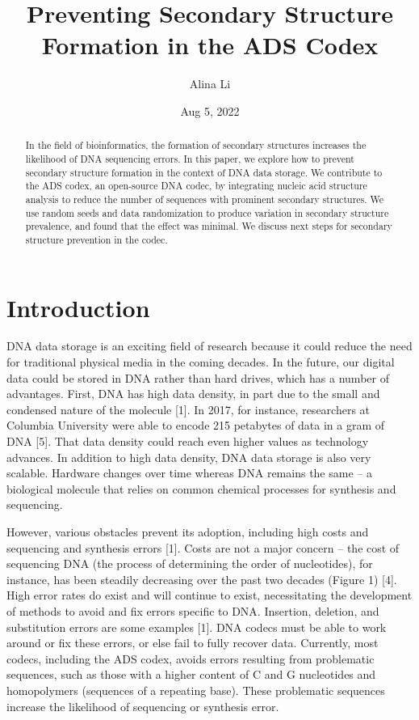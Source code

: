 \documentclass{article}
\title{Preventing Secondary Structure Formation in the ADS Codex}
\author{Alina Li}
\date{Aug 5, 2022}
\begin{document}
 
\maketitle

\begin{abstract}
In the field of bioinformatics, the formation of secondary structures increases the likelihood of DNA sequencing errors. In this paper, we explore how to prevent secondary structure formation in the context of DNA data storage. We contribute to the ADS codex, an open-source DNA codec, by integrating nucleic acid structure analysis to reduce the number of sequences with prominent secondary structures. We use random seeds and data randomization to produce variation in secondary structure prevalence, and found that the effect was minimal. We discuss next steps for secondary structure prevention in the codec.
\end{abstract}

\section{Introduction}
DNA data storage is an exciting field of research because it could reduce the need for traditional physical media in the coming decades. In the future, our digital data could be stored in DNA rather than hard drives, which has a number of advantages. First, DNA has high data density, in part due to the small and condensed nature of the molecule [1]. In 2017, for instance, researchers at Columbia University were able to encode 215 petabytes of data in a gram of DNA [5]. That data density could reach even higher values as technology advances. In addition to high data density, DNA data storage is also very scalable. Hardware changes over time whereas DNA remains the same -- a biological molecule that relies on common chemical processes for synthesis and sequencing.  

However, various obstacles prevent its adoption, including high costs and sequencing and synthesis errors [1]. Costs are not a major concern -- the cost of sequencing DNA (the process of determining the order of nucleotides), for instance, has been steadily decreasing over the past two decades (Figure 1) [4]. High error rates do exist and will continue to exist, necessitating the development of methods to avoid and fix errors specific to DNA. Insertion, deletion, and substitution errors are some examples [1]. DNA codecs must be able to work around or fix these errors, or else fail to fully recover data. Currently, most codecs, including the ADS codex, avoids errors resulting from problematic sequences, such as those with a higher content of C and G nucleotides and homopolymers (sequences of a repeating base). These problematic sequences increase the likelihood of sequencing or synthesis error. 
\end{document}

